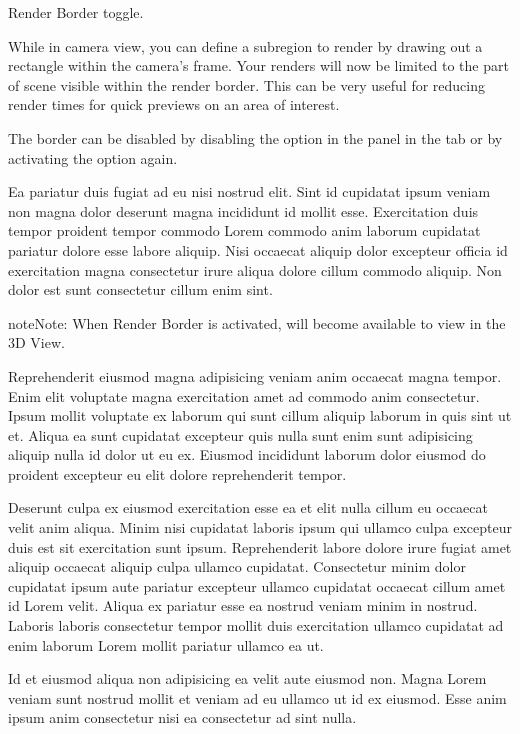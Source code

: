 \documentclass[a4paper,10pt,french]{sphinxmanual}
\begin{document}
Render Border toggle.

While in camera view, you can define a subregion to render by drawing out a rectangle within the camera's frame.
Your renders will now be limited to the part of scene visible within the render border.
This can be very useful for reducing render times for quick previews on an area of interest.

The border can be disabled by disabling the  option in the  panel
in the  tab or by activating the option again.

Ea pariatur duis fugiat ad eu nisi nostrud elit. Sint id cupidatat ipsum veniam non magna dolor deserunt magna incididunt id mollit esse. Exercitation duis tempor proident tempor commodo Lorem commodo anim laborum cupidatat pariatur dolore esse labore aliquip. Nisi occaecat aliquip dolor excepteur officia id exercitation magna consectetur irure aliqua dolore cillum commodo aliquip. Non dolor est sunt consectetur cillum enim sint.

\begin{sphinxadmonition}{note}{Note:}
When Render Border is activated, 
will become available to view in the 3D View.
\end{sphinxadmonition}

Reprehenderit eiusmod magna adipisicing veniam anim occaecat magna tempor. Enim elit voluptate magna exercitation amet ad commodo anim consectetur. Ipsum mollit voluptate ex laborum qui sunt cillum aliquip laborum in quis sint ut et. Aliqua ea sunt cupidatat excepteur quis nulla sunt enim sunt adipisicing aliquip nulla id dolor ut eu ex. Eiusmod incididunt laborum dolor eiusmod do proident excepteur eu elit dolore reprehenderit tempor.

Deserunt culpa ex eiusmod exercitation esse ea et elit nulla cillum eu occaecat velit anim aliqua. Minim nisi cupidatat laboris ipsum qui ullamco culpa excepteur duis est sit exercitation sunt ipsum. Reprehenderit labore dolore irure fugiat amet aliquip occaecat aliquip culpa ullamco cupidatat. Consectetur minim dolor cupidatat ipsum aute pariatur excepteur ullamco cupidatat occaecat cillum amet id Lorem velit. Aliqua ex pariatur esse ea nostrud veniam minim in nostrud. Laboris laboris consectetur tempor mollit duis exercitation ullamco cupidatat ad enim laborum Lorem mollit pariatur ullamco ea ut.

Id et eiusmod aliqua non adipisicing ea velit aute eiusmod non. Magna Lorem veniam sunt nostrud mollit et veniam ad eu ullamco ut id ex eiusmod. Esse anim ipsum anim consectetur nisi ea consectetur ad sint nulla.
\end{document}
